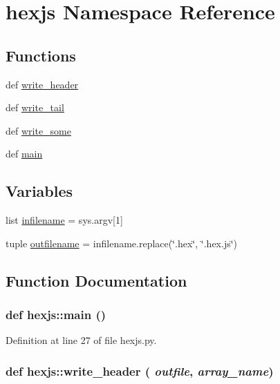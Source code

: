 \hypertarget{namespacehexjs}{
\section{hexjs Namespace Reference}
\label{namespacehexjs}
}
\subsection*{Functions}
\begin{DoxyCompactItemize}
\item 
def \hyperlink{namespacehexjs_a90cf8d760786132e3d3e241baf1c90ee}{write\_\-header}
\item 
def \hyperlink{namespacehexjs_af0932b2aeffceebd34dddb90dd7ab27d}{write\_\-tail}
\item 
def \hyperlink{namespacehexjs_a4e78f97739ff44f824e42ecf26fa31e7}{write\_\-some}
\item 
def \hyperlink{namespacehexjs_a4211122bebd6f95cd479db25c55b9b9d}{main}
\end{DoxyCompactItemize}
\subsection*{Variables}
\begin{DoxyCompactItemize}
\item 
list \hyperlink{namespacehexjs_adb5213a3eff5b36bd5225eba0dee91ef}{infilename} = sys.argv\mbox{[}1\mbox{]}
\item 
tuple \hyperlink{namespacehexjs_a23feae6d177f8d14fac8d81d089abd7c}{outfilename} = infilename.replace(\char`\"{}.hex\char`\"{}, \char`\"{}.hex.js\char`\"{})
\end{DoxyCompactItemize}


\subsection{Function Documentation}
\hypertarget{namespacehexjs_a4211122bebd6f95cd479db25c55b9b9d}{
\subsubsection[{main}]{\setlength{\rightskip}{0pt plus 5cm}def hexjs::main ()}}
\label{namespacehexjs_a4211122bebd6f95cd479db25c55b9b9d}


Definition at line 27 of file hexjs.py.

\hypertarget{namespacehexjs_a90cf8d760786132e3d3e241baf1c90ee}{
\subsubsection[{write\_\-header}]{\setlength{\rightskip}{0pt plus 5cm}def hexjs::write\_\-header ( {\em outfile}, \/   {\em array\_\-name})}}
\label{namespacehexjs_a90cf8d760786132e3d3e241baf1c90ee}


